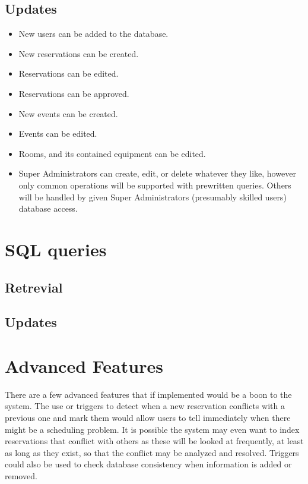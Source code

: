 \documentclass{article}
\begin{document}
\subsection{Updates}
\begin{itemize}
\item New users can be added to the database.
\item New reservations can be created.
\item Reservations can be edited.
\item Reservations can be approved.
\item New events can be created.
\item Events can be edited.
\item Rooms, and its contained equipment can be edited.
\item Super Administrators can create, edit, or delete whatever they like,
however only common operations will be supported with prewritten queries.
Others will be handled by given Super Administrators (presumably skilled users) database access.
\end{itemize}

\section{SQL queries}
\subsection{Retrevial}


\subsection{Updates}

\section{Advanced Features}
There are a few advanced features that if implemented would be a boon to the system. The use or triggers to detect
when a new reservation conflicts with a previous one and mark them would allow users to tell immediately when there
might be a scheduling problem. It is possible the system may even want to index reservations that conflict with others
as these will be looked at frequently, at least as long as they exist, so that the conflict may be analyzed and resolved.
Triggers could also be used to check database consistency when information is added or removed.
\end{document}
